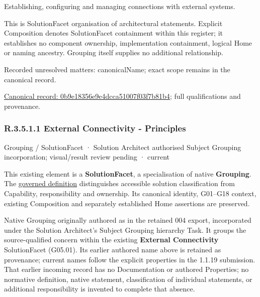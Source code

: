 Establishing, configuring and managing connections with external systems.



This is SolutionFacet organisation of architectural statements. Explicit Composition denotes SolutionFacet containment within this register; it establishes no component ownership, implementation containment, logical Home or naming ancestry. Grouping itself supplies no additional relationship.


{\small Recorded unresolved matters: canonicalName; exact scope remains in the canonical record.}\par
{\footnotesize \href{../../../../../../../continuum/grouping/0b9e18356e9e4dcca51007f03f7b81b4.md}{Canonical record: 0b9e18356e9e4dcca51007f03f7b81b4}; full qualifications and provenance.}\par
\subsubsection*{R.3.5.1.1 External Connectivity - Principles}
\label{navigation:R.3.5.1.1}

\label{element:011207c2c69f42d7a5c9c7504ffbc951}
{\small Grouping / SolutionFacet · Solution Architect authorised Subject Grouping incorporation; visual/result review pending · current}\par

This existing element is a \textbf{SolutionFacet}, a specialisation of native
\textbf{Grouping}. The \href{\detokenize{../../../../../../../governance/continuum-representation.md#solutionfacet-classification--1119-candidate}}{governed definition}
distinguishes accessible solution classification from Capability, responsibility
and ownership. Its canonical identity, G01–G18 context, existing Composition
and separately established Home assertions are preserved.



Native Grouping originally authored as \texttt{} in the retained 004 export,
incorporated under the Solution Architect's Subject Grouping hierarchy Task.
It groups the source-qualified \texttt{} concern within
the existing \textbf{External Connectivity} SolutionFacet (G05.01). Its earlier authored name above is retained as provenance; current names
follow the explicit properties in the 1.1.19 submission.
That earlier incoming record has no Documentation or authored Properties; no normative
definition, native statement, classification of individual statements, or
additional responsibility is invented to complete that absence.



